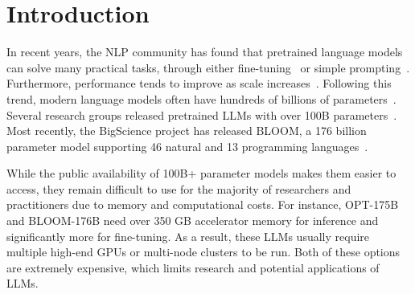 \section{Introduction}


In recent years, the NLP community has found that pretrained language models can solve many practical tasks, through either fine-tuning~\citep{gpt} or simple prompting~\citep{gpt3}. Furthermore, performance tends to improve as scale increases~\citep{gpt2, kaplan2020scaling}. Following this trend, modern language models often have hundreds of billions of parameters~\citep{gpt3,gopher,pangua,hyperclova}\nocite{switch,jurrasic,Lepikhin2020GShardSG,glam}. Several research groups released pretrained LLMs with over 100B parameters~\citep{opt,yalm,zeng2020glm}\nocite{gpt,gpt-neox-20b}. Most recently, the BigScience project has released BLOOM, a 176 billion parameter model supporting 46 natural and 13 programming languages~\citep{bloom}.


While the public availability of 100B+ parameter models makes them easier to access, they remain difficult to use for the majority of researchers and practitioners due to memory and computational costs. For instance, OPT-175B and BLOOM-176B need over 350 GB accelerator memory for inference and significantly more for fine-tuning. As a result, these LLMs usually require multiple high-end GPUs or multi-node clusters\nocite{megatron2} to be run. Both of these options are extremely expensive, which limits research and potential applications of LLMs.



